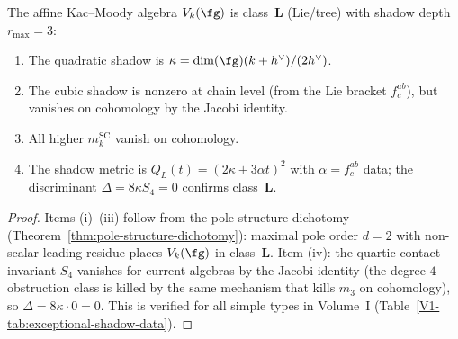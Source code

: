 \begin{proposition}
\label{prop:tw-hol-shadow-archetype}
The affine Kac--Moody algebra $V_k(\fg)$ is class~$\mathbf{L}$
\textup{(}Lie/tree\textup{)} with shadow depth $r_{\max} = 3$:
\begin{enumerate}[label=\textup{(\roman*)},nosep]
\item The quadratic shadow is
 $\kappa = \dim(\fg)(k + h^\vee)/(2h^\vee)$.
\item The cubic shadow is nonzero at chain level
 \textup{(}from the Lie bracket $f^{ab}_c$\textup{)}, but
 vanishes on cohomology by the Jacobi identity.
\item All higher $m_k^{\mathrm{SC}}$ vanish on cohomology.
\item The shadow metric is $Q_L(t) = (2\kappa + 3\alpha t)^2$
 with $\alpha = f^{ab}_c$ data; the discriminant
 $\Delta = 8\kappa S_4 = 0$ confirms class~$\mathbf{L}$.
\end{enumerate}
\end{proposition}

\begin{proof}
Items (i)--(iii) follow from the pole-structure dichotomy
(Theorem~\ref{thm:pole-structure-dichotomy}): maximal pole order
$d = 2$ with non-scalar leading residue places $V_k(\fg)$ in
class~$\mathbf{L}$. Item (iv): the quartic contact invariant $S_4$ vanishes
for current algebras by the Jacobi identity (the degree-$4$
obstruction class is killed by the same mechanism that kills
$m_3$ on cohomology), so $\Delta = 8\kappa \cdot 0 = 0$.
This is verified for all simple types in Volume~I
(Table~\ref*{V1-tab:exceptional-shadow-data}).
\end{proof}

